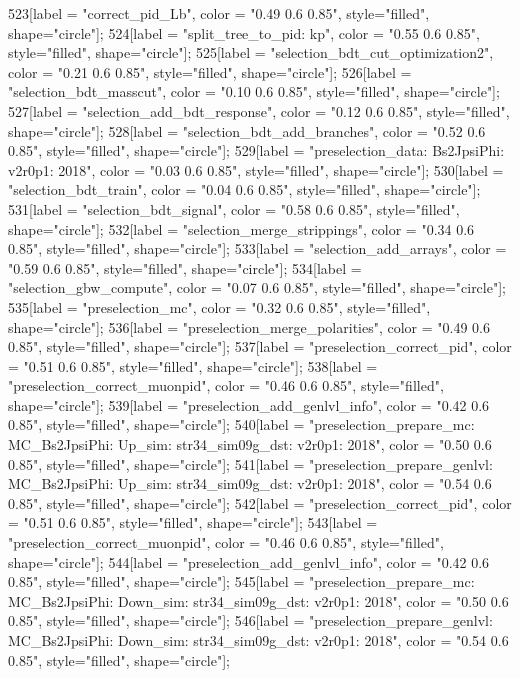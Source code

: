 {	523[label = "correct_pid_Lb", color = "0.49 0.6 0.85", style="filled", shape="circle"];
	524[label = "split_tree_to_pid\npkkp: kp", color = "0.55 0.6 0.85", style="filled", shape="circle"];
	525[label = "selection_bdt_cut_optimization2", color = "0.21 0.6 0.85", style="filled", shape="circle"];
	526[label = "selection_bdt_masscut", color = "0.10 0.6 0.85", style="filled", shape="circle"];
	527[label = "selection_add_bdt_response", color = "0.12 0.6 0.85", style="filled", shape="circle"];
	528[label = "selection_bdt_add_branches", color = "0.52 0.6 0.85", style="filled", shape="circle"];
	529[label = "preselection_data\nmode: Bs2JpsiPhi\nversion: v2r0p1\nyear: 2018", color = "0.03 0.6 0.85", style="filled", shape="circle"];
	530[label = "selection_bdt_train", color = "0.04 0.6 0.85", style="filled", shape="circle"];
	531[label = "selection_bdt_signal", color = "0.58 0.6 0.85", style="filled", shape="circle"];
	532[label = "selection_merge_strippings", color = "0.34 0.6 0.85", style="filled", shape="circle"];
	533[label = "selection_add_arrays", color = "0.59 0.6 0.85", style="filled", shape="circle"];
	534[label = "selection_gbw_compute", color = "0.07 0.6 0.85", style="filled", shape="circle"];
	535[label = "preselection_mc", color = "0.32 0.6 0.85", style="filled", shape="circle"];
	536[label = "preselection_merge_polarities", color = "0.49 0.6 0.85", style="filled", shape="circle"];
	537[label = "preselection_correct_pid", color = "0.51 0.6 0.85", style="filled", shape="circle"];
	538[label = "preselection_correct_muonpid", color = "0.46 0.6 0.85", style="filled", shape="circle"];
	539[label = "preselection_add_genlvl_info", color = "0.42 0.6 0.85", style="filled", shape="circle"];
	540[label = "preselection_prepare_mc\nmode: MC_Bs2JpsiPhi\npolarity: Up\nstrip_sim: str34_sim09g_dst\nversion: v2r0p1\nyear: 2018", color = "0.50 0.6 0.85", style="filled", shape="circle"];
	541[label = "preselection_prepare_genlvl\nmode: MC_Bs2JpsiPhi\npolarity: Up\nstrip_sim: str34_sim09g_dst\nversion: v2r0p1\nyear: 2018", color = "0.54 0.6 0.85", style="filled", shape="circle"];
	542[label = "preselection_correct_pid", color = "0.51 0.6 0.85", style="filled", shape="circle"];
	543[label = "preselection_correct_muonpid", color = "0.46 0.6 0.85", style="filled", shape="circle"];
	544[label = "preselection_add_genlvl_info", color = "0.42 0.6 0.85", style="filled", shape="circle"];
	545[label = "preselection_prepare_mc\nmode: MC_Bs2JpsiPhi\npolarity: Down\nstrip_sim: str34_sim09g_dst\nversion: v2r0p1\nyear: 2018", color = "0.50 0.6 0.85", style="filled", shape="circle"];
	546[label = "preselection_prepare_genlvl\nmode: MC_Bs2JpsiPhi\npolarity: Down\nstrip_sim: str34_sim09g_dst\nversion: v2r0p1\nyear: 2018", color = "0.54 0.6 0.85", style="filled", shape="circle"];
}
